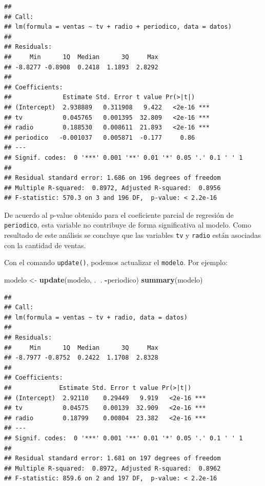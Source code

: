 \documentclass[]{book}
\newenvironment{Shaded}{\begin{snugshade}}{\end{snugshade}}
\newcommand{\KeywordTok}[1]{\textcolor[rgb]{0.13,0.29,0.53}{\textbf{#1}}}
\newcommand{\StringTok}[1]{\textcolor[rgb]{0.31,0.60,0.02}{#1}}
\newcommand{\OperatorTok}[1]{\textcolor[rgb]{0.81,0.36,0.00}{\textbf{#1}}}
\newcommand{\NormalTok}[1]{#1}
\begin{document}
\begin{verbatim}
## 
## Call:
## lm(formula = ventas ~ tv + radio + periodico, data = datos)
## 
## Residuals:
##     Min      1Q  Median      3Q     Max 
## -8.8277 -0.8908  0.2418  1.1893  2.8292 
## 
## Coefficients:
##              Estimate Std. Error t value Pr(>|t|)    
## (Intercept)  2.938889   0.311908   9.422   <2e-16 ***
## tv           0.045765   0.001395  32.809   <2e-16 ***
## radio        0.188530   0.008611  21.893   <2e-16 ***
## periodico   -0.001037   0.005871  -0.177     0.86    
## ---
## Signif. codes:  0 '***' 0.001 '**' 0.01 '*' 0.05 '.' 0.1 ' ' 1
## 
## Residual standard error: 1.686 on 196 degrees of freedom
## Multiple R-squared:  0.8972, Adjusted R-squared:  0.8956 
## F-statistic: 570.3 on 3 and 196 DF,  p-value: < 2.2e-16
\end{verbatim}

De acuerdo al p-value obtenido para el coeficiente parcial de regresión
de \texttt{periodico}, esta variable no contribuye de forma
significativa al modelo. Como resultado de este análisis se concluye que
las variables \texttt{tv} y \texttt{radio} están asociadas con la
cantidad de ventas.

Con el comando \texttt{update()}, podemos actualizar el \texttt{modelo}.
Por ejemplo:

\begin{Shaded}
\begin{Highlighting}[]
\NormalTok{modelo <-}\StringTok{ }\KeywordTok{update}\NormalTok{(modelo, .}\OperatorTok{~}\NormalTok{. }\OperatorTok{-}\NormalTok{periodico)}
\KeywordTok{summary}\NormalTok{(modelo)}
\end{Highlighting}
\end{Shaded}

\begin{verbatim}
## 
## Call:
## lm(formula = ventas ~ tv + radio, data = datos)
## 
## Residuals:
##     Min      1Q  Median      3Q     Max 
## -8.7977 -0.8752  0.2422  1.1708  2.8328 
## 
## Coefficients:
##             Estimate Std. Error t value Pr(>|t|)    
## (Intercept)  2.92110    0.29449   9.919   <2e-16 ***
## tv           0.04575    0.00139  32.909   <2e-16 ***
## radio        0.18799    0.00804  23.382   <2e-16 ***
## ---
## Signif. codes:  0 '***' 0.001 '**' 0.01 '*' 0.05 '.' 0.1 ' ' 1
## 
## Residual standard error: 1.681 on 197 degrees of freedom
## Multiple R-squared:  0.8972, Adjusted R-squared:  0.8962 
## F-statistic: 859.6 on 2 and 197 DF,  p-value: < 2.2e-16
\end{verbatim}
\end{document}
